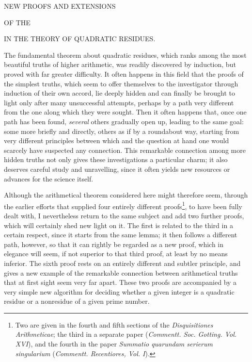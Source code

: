 \begin{center}
{\large NEW PROOFS AND EXTENSIONS\par}
\smallskip OF THE\par
{}
\medskip IN THE THEORY OF QUADRATIC RESIDUES.\par
\end{center}
\BookRule{20mm}
The fundamental theorem about quadratic residues, which ranks among the most beautiful truths of higher arithmetic, was readily discovered by induction, but proved with far greater difficulty. It often happens in this field that the proofs of the simplest truths, which seem to offer themselves to the investigator through induction of their own accord, lie deeply hidden and can finally be brought to light only after many unsuccessful attempts, perhaps by a path very different from the one along which they were sought. Then it often happens that, once one path has been found, \textit{several} others gradually open up, leading to the same goal: some more briefly and directly, others as if by a roundabout way, starting from very different principles between which and the question at hand one would scarcely have suspected any connection. This remarkable connection among more hidden truths not only gives these investigations a particular charm; it also deserves careful study and unravelling, since it often yields new resources or advances for the science itself.

Although the arithmetical theorem considered here might therefore seem, through the earlier efforts that supplied four entirely different proofs\begingroup\renewcommand{\thefootnote}{*)}\footnote{Two are given in the fourth and fifth sections of the \textit{Disquisitiones Arithmeticae}; the third in a separate paper (\textit{Commentt. Soc. Gotting. Vol. XVI}), and the fourth in the paper \textit{Summatio quarundam serierum singularium} (\textit{Commentt. Recentiores, Vol. I}).}\endgroup, to have been fully dealt with, I nevertheless return to the same subject and add two further proofs, which will certainly shed new light on it. The first is related to the third in a certain respect, since it starts from the same lemma; it then follows a different path, however, so that it can rightly be regarded as a new proof, which in elegance will seem, if not superior to that third proof, at least by no means inferior. The sixth proof rests on an entirely different and subtler principle, and gives a new example of the remarkable connection between arithmetical truths that at first sight seem very far apart. These two proofs are accompanied by a very simple new algorithm for deciding whether a given integer is a quadratic residue or a nonresidue of a given prime number.

